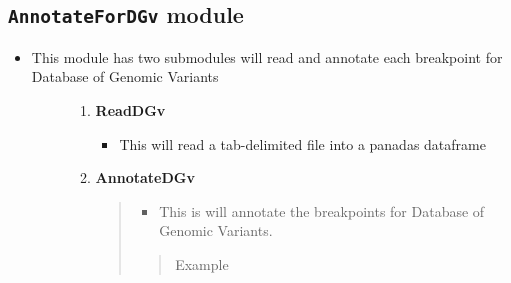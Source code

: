 \documentclass[letterpaper,10pt,english]{sphinxmanual}
\begin{document}
\subsection{\texttt{AnnotateForDGv} module}
\label{iAnnotateSV:annotatefordgv-module}\begin{itemize}
\item {} \begin{description}
\item[{This module has two submodules will read and annotate each breakpoint for Database of Genomic Variants}] \leavevmode\begin{enumerate}
\item {} 
\textbf{ReadDGv}
\begin{itemize}
\item {} 
This will read a tab-delimited file into a panadas dataframe

\end{itemize}

\item {} 
\textbf{AnnotateDGv}
\begin{quote}
\begin{itemize}
\item {} 
This is will annotate the breakpoints for Database of Genomic Variants.

\end{itemize}
\begin{quote}\begin{description}
\item[{Example}] \leavevmode
{}

\end{description}\end{quote}
\end{quote}

\end{enumerate}

\end{description}

\end{itemize}
\end{document}
